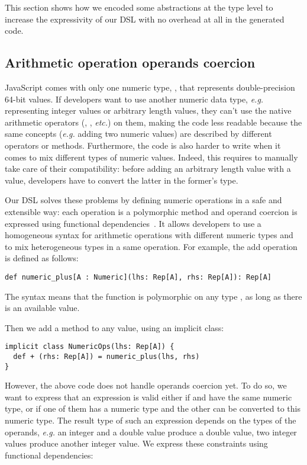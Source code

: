 \documentclass[american,english,runningheads]{llncs}
\newcommand{\eg}{\emph{e.g.}}
\newcommand{\etc}{\emph{etc.}}
\begin{document}
This section shows how we encoded some abstractions at the type level to increase the expressivity of our DSL with no overhead at all in the generated code.

\subsection{Arithmetic operation operands coercion}

JavaScript comes with only one numeric type, , that represents double-precision 64-bit values. If developers want to use another numeric data type, \eg{} representing integer values or arbitrary length values, they can’t use the native arithmetic operators (\code{+}, \code{-}, \etc) on them, making the code less readable because the same concepts (\eg{} adding two numeric values) are described by different operators or methods. Furthermore, the code is also harder to write when it comes to mix different types of numeric values. Indeed, this requires to manually take care of their compatibility: before adding an arbitrary length value with a  value, developers have to convert the latter in the former’s type.

Our DSL solves these problems by defining numeric operations in a safe and extensible way: each operation is a polymorphic method and operand coercion is expressed using functional dependencies~\cite{Jones00_FunDeps}. It allows developers to use a homogeneous syntax for arithmetic operations with different numeric types and to mix heterogeneous types in a same operation. For example, the add operation is defined as follows:

\begin{lstlisting}
def numeric_plus[A : Numeric](lhs: Rep[A], rhs: Rep[A]): Rep[A]
\end{lstlisting}

The  syntax means that the function is polymorphic on any type , as long as there is an available  value.

Then we add a \code{+} method to any  value, using an implicit class:

\begin{lstlisting}
implicit class NumericOps(lhs: Rep[A]) {
  def + (rhs: Rep[A]) = numeric_plus(lhs, rhs)
}
\end{lstlisting}

However, the above code does not handle operands coercion yet. To do so, we want to express that an expression  is valid either if  and  have the same numeric type, or if one of them has a numeric type and the other can be converted to this numeric type. The result type of such an expression depends on the types of the operands, \eg{} an integer and a double value produce a double value, two integer values produce another integer value. We express these constraints using functional dependencies:
\end{document}
